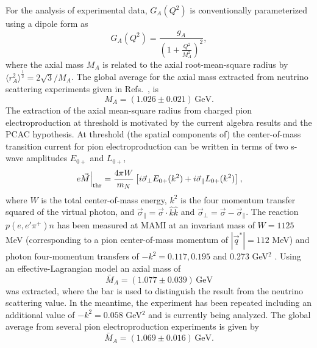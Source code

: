 \documentclass[twoside,12pt]{article}
\begin{document}
   For the analysis of experimental data, $G_A(Q^2)$ is conventionally
parameterized using a dipole form as
\begin{equation}
\label{GAPara}
    G_A(Q^2)=\frac{g_A}{(1+\frac{Q^2}{M^2_A})^2},
\end{equation}
where the axial mass $M_A$ is related to the axial root-mean-square
radius by $\langle r^2_A\rangle^\frac{1}{2}=2\sqrt{3}/M_A$.
    The global average for the axial mass extracted from neutrino scattering
experiments given in Refs.\ \linebreak \cite{Liesenfeld:1999mv}, \cite{Bernard:2001rs} is
\begin{equation}\label{MAv1}
    M_A = (1.026 \pm 0.021)\,\mbox{GeV}.
\end{equation}
  The extraction of the axial mean-square radius from
charged pion electroproduction at threshold is motivated by
the current algebra results and the PCAC hypothesis.
   At threshold (the spatial components of) the center-of-mass transition current
for pion electroproduction can be written in terms of two s-wave amplitudes
$E_{0+}$ and $L_{0+}$,
\begin{displaymath}
\left.e\vec{M}\right|_{\rm thr}=\frac{4\pi W}{m_N}\left[i\vec\sigma_\perp
E_{0+}(k^2) +i\vec{\sigma}_\parallel L_{0+}(k^2)\right],
\end{displaymath}
where $W$ is the total center-of-mass energy, $k^2$ is the four momentum transfer
squared of the virtual photon, and $\vec{\sigma}_\parallel=\vec \sigma\cdot\hat
k\hat k$ and $\vec\sigma_\perp= \vec \sigma-\vec{\sigma}_\parallel$.
   The reaction $p(e,e'\pi^+)n$ has been measured at MAMI at an invariant mass
of $W=1125$ MeV (corresponding to a pion center-of-mass momentum of
$|\vec{q}^\ast|=112$ MeV) and photon four-momentum transfers of $-k^2=0.117,
0.195$ and 0.273 GeV$^2$ \cite{Liesenfeld:1999mv}.
   Using an effective-Lagrangian model
an axial mass of
\begin{displaymath}
\bar{M}_A=(1.077\pm 0.039)\,\mbox{GeV}
\end{displaymath}
was extracted, where the bar is used to distinguish the result from the
neutrino scattering value.
    In the meantime, the experiment has been repeated including an
additional value of $-k^2=0.058$ GeV$^2$ and is currently
being analyzed.
   The global average from several pion electroproduction experiments
is given by \cite{Bernard:2001rs}
\begin{equation}\label{MApi}
    \bar{M}_A=(1.069\pm 0.016)\,\mbox{GeV}.
\end{equation}
\end{document}
